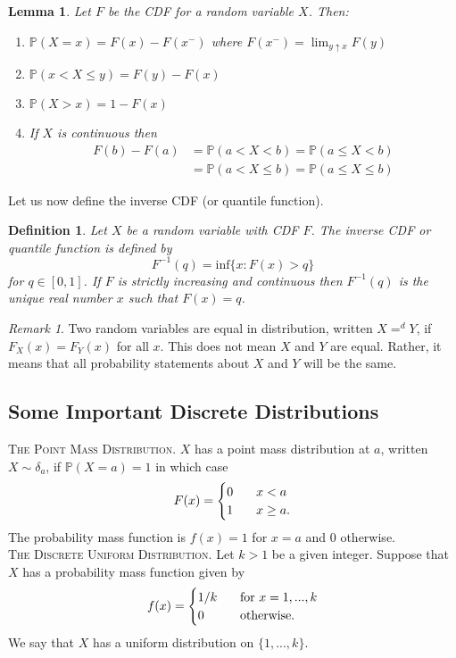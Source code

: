 \documentclass{article}
\newtheorem{definition}[counter]{Definition}
\newtheorem{lemma}[counter]{Lemma}
\theoremstyle{remark}
\newtheorem{remark}[counter]{Remark}
\newcommand{\1}{\mathbf{1}}
\newcommand{\Prob}{\mathbb{P}}
\begin{document}
\begin{lemma}
	Let $F$ be the CDF for a random variable $X$. Then:
	\begin{enumerate}
		\item $\Prob(X = x) = F(x) - F(x^-)$ where $F(x^-) = \lim_{y\uparrow x}F(y)$
		\item $\Prob(x < X \leq y) = F(y) - F(x)$
		\item $\Prob(X>x) = 1-F(x)$
		\item If $X$ is continuous then
		\[
		\begin{split}
		F(b)-F(a) 	&= \Prob(a < X < b) = \Prob(a \leq X < b) \\
					&= \Prob(a < X \leq b) = \Prob(a \leq X \leq b)
		\end{split}
		\] 
	\end{enumerate}
\end{lemma}
Let us now define the inverse CDF (or quantile function).
\begin{definition}
	Let $X$ be a random variable with CDF $F$. The inverse CDF or quantile function is defined by
	\[
	F^{-1}(q) = \text{inf} \{x: F(x) > q\}
	\]
	for $q \in [0,1]$. If $F$ is strictly increasing and continuous then $F^{-1}(q)$ is the unique real number $x$ such that $F(x) = q$.
\end{definition}
\begin{remark}
	Two random variables are equal in distribution, written $X =^d Y$, if $F_X(x) = F_Y(x)$ for all $x$. This does not mean $X$ and $Y$ are equal. Rather, it means that all probability statements about $X$ and $Y$ will be the same.  
\end{remark}

\subsection{Some Important Discrete Distributions}
\textsc{The Point Mass Distribution}. $X$ has a point mass distribution at $a$, written $X \sim \delta_a$, if $\Prob(X=a)=1$ in which case
\[
F(x) = \begin{cases}
0 \hspace{3mm} &x < a \\
1 \hspace{3mm} &x \geq a.
\end{cases}
\]
The probability mass function is $f(x) = 1$ for $x=a$ and 0 otherwise.
\\

\noindent\textsc{The Discrete Uniform Distribution}. Let $k>1$ be a given integer. Suppose that $X$ has a probability mass function given by
\[
f(x) = \begin{cases}
1/k \hspace{3mm} &\text{for } x = 1,...,k \\
0 \hspace{3mm} &\text{otherwise}.
\end{cases}
\]
We say that $X$ has a uniform distribution on $\{1,...,k\}$. \\
\end{document}
